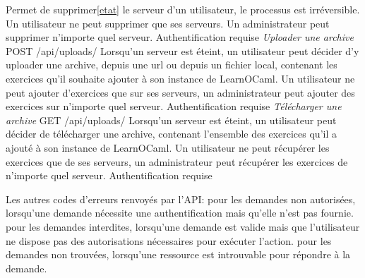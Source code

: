 \documentclass{article}
\begin{document}
Permet de supprimer\ref{etat} le serveur d'un utilisateur, le processus est irréversible.
\newline
Un utilisateur ne peut supprimer que ses serveurs. Un administrateur peut supprimer n'importe quel serveur.
\newline
Authentification requise
\newline
\newline
\textit{Uploader une archive}
\newline
POST /api/uploads/
\newline
Lorsqu'un serveur est éteint, un utilisateur peut décider d'y uploader une archive, depuis une url ou depuis un fichier local, contenant les exercices qu'il souhaite ajouter à son instance de LearnOCaml.
\newline
Un utilisateur ne peut ajouter d'exercices que sur ses serveurs, un administrateur peut ajouter des exercices sur n'importe quel serveur.
\newline
Authentification requise
\newline
\newline
\textit{Télécharger une archive}
\newline
GET /api/uploads/
\newline
Lorsqu'un serveur est éteint, un utilisateur peut décider de télécharger une archive, contenant l'ensemble des exercices qu'il a ajouté à son instance de LearnOCaml.
\newline
Un utilisateur ne peut récupérer les exercices que de ses serveurs, un administrateur peut récupérer les exercices de n'importe quel serveur.
\newline
Authentification requise
\newline
\newline


Les autres codes d'erreurs renvoyés par l'API:
 pour les demandes non autorisées, lorsqu'une demande nécessite une authentification mais qu'elle n'est pas fournie.
 pour les demandes interdites, lorsqu'une demande est valide mais que l'utilisateur ne dispose pas des autorisations nécessaires pour exécuter l'action.
 pour les demandes non trouvées, lorsqu'une ressource est introuvable pour répondre à la demande.

\newpage
\end{document}
